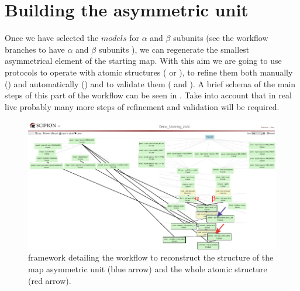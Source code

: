 
\section{Building the asymmetric unit}
\label{buildingunitcell}

Once we have selected the $models$ for  $\alpha$ and $\beta$ subunits (see the workflow branches to have $\alpha$ and $\beta$ subunits ), we can regenerate the smallest asymmetrical element of the starting map. With this aim we are going to use protocols to operate with atomic structures ( or ), to refine them both manually () and automatically () and to validate them ( and ). A brief schema of the main steps of this part of the workflow can be seen in . Take into account that in real live probably many more steps of refinement and validation will be required.\\ 

 \begin{figure}[H]
  \centering 
  \captionsetup{width=.9\linewidth} 
  \includegraphics[width=1\textwidth]{Images/Fig73}
  \caption{\scipion framework detailing the workflow to reconstruct the structure of the map asymmetric unit (blue arrow) and the whole atomic structure (red arrow).}
  \label{fig:scipion_workflow_whole_reconstruction}
  \end{figure}

